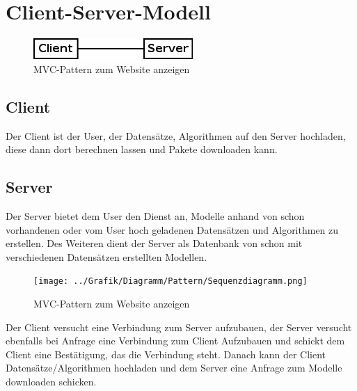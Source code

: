 \section{Client-Server-Modell}

\begin{figure}[h]
	\centering
	\includegraphics[scale=0.6]{../Grafik/Diagramm/Pattern/ClientServer/Kontext.png}
	\caption[MVC Website Klassen]{MVC-Pattern zum Website anzeigen}
\end{figure}

\subsection*{Client}
Der Client ist der User, der Datensätze, Algorithmen auf den Server hochladen, diese dann dort berechnen lassen und Pakete downloaden kann.

\subsection*{Server}
Der Server bietet dem User den Dienst an, Modelle anhand von schon vorhandenen oder vom User hoch geladenen Datensätzen und Algorithmen zu erstellen. Des Weiteren dient der Server als Datenbank von schon mit verschiedenen Datensätzen erstellten Modellen.

\begin{figure}[h]
	\centering
	\texttt{[image: ../Grafik/Diagramm/Pattern/Sequenzdiagramm.png]}
	\caption[MVC Website Klassen]{MVC-Pattern zum Website anzeigen}
\end{figure}

Der Client versucht eine Verbindung zum Server aufzubauen, der Server versucht ebenfalls bei Anfrage eine Verbindung zum Client Aufzubauen und schickt dem Client eine Bestätigung, das die Verbindung steht. Danach kann der Client Datensätze/Algorithmen hochladen und dem Server eine Anfrage zum Modelle downloaden schicken.

